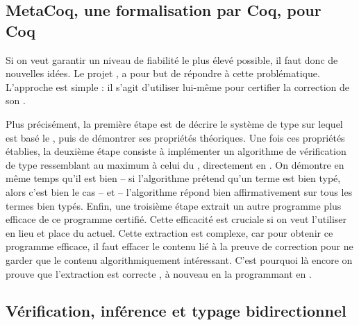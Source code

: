 \subsection[MetaCoq]{MetaCoq, une formalisation par Coq, pour Coq}
\label{sec:intro-metacoq}


Si on veut garantir un niveau de fiabilité le plus élevé possible, il faut donc de nouvelles idées.
Le projet , a pour but de répondre à cette problématique.
L’approche est simple : il s’agit d’utiliser  lui-même pour certifier la correction de son .

Plus précisément, la première étape est de décrire le système de type sur lequel est basé le , puis de démontrer ses propriétés théoriques.
Une fois ces propriétés établies, la deuxième étape%
consiste à implémenter un algorithme de vérification de type ressemblant au maximum à celui du , directement en .
On démontre en même temps qu’il est bien  –
  si l’algorithme prétend qu’un terme est bien typé, alors c’est bien le cas –
et  – l’algorithme répond bien affirmativement sur tous les termes bien typés.
Enfin, une troisième étape extrait
un autre programme plus efficace de ce programme  certifié.
Cette efficacité est cruciale si on veut l’utiliser en lieu et place du  actuel.
Cette extraction est complexe, car pour obtenir ce programme efficace, il
faut effacer le contenu lié à la preuve de correction
pour ne garder que le contenu algorithmiquement intéressant.
C’est pourquoi là encore on prouve que l’extraction est correcte%
,
à nouveau en la programmant en .

\subsection[Typage bidirectionnel]{Vérification, inférence et typage bidirectionnel}

